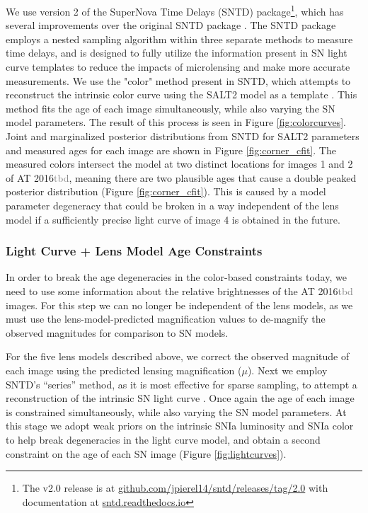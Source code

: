 \documentclass[12pt,dvipsnames]{article}
\def\SNABC{AT 2016{\textcolor{Gray}{tbd}}\xspace}
\begin{document}
We use version 2 of the SuperNova Time Delays (SNTD) package\footnote{The v2.0 release is at \href{https://github.com/jpierel14/sntd/releases/tag/2.0}{github.com/jpierel14/sntd/releases/tag/2.0} with documentation at 
\href{https://sntd.readthedocs.io/en/latest/}{sntd.readthedocs.io}}, which has several improvements over the original SNTD package \cite{pierel_turning_2019}. The SNTD package employs a nested sampling algorithm within three separate methods to measure time delays, and is designed to fully utilize the information present in SN light curve templates \cite{hsiao_k_2007,guy_salt2:_2007,kessler_results_2010,pierel_extending_2018} to reduce the impacts of microlensing and make more accurate measurements. We use the "color" method present in SNTD, which attempts to reconstruct the intrinsic color curve using the SALT2 model as a template \cite{guy_salt2:_2007}. This method fits the age of each image simultaneously, while also varying the SN model parameters. The result of this process is seen in Figure \ref{fig:colorcurves}. Joint and marginalized posterior distributions
from SNTD for SALT2 parameters and measured ages for each image are shown in Figure \ref{fig:corner_cfit}.  The measured colors intersect the model at two distinct locations for images 1 and 2 of \SNABC, meaning there are two plausible ages that cause a double peaked posterior distribution (Figure \ref{fig:corner_cfit}). This is caused by a model parameter degeneracy that could be broken in a way independent of the lens model if a sufficiently precise light curve of image 4 is obtained in the future.


\subsubsection*{Light Curve + Lens Model Age Constraints}

In order to break the age degeneracies in the color-based constraints today, we need to use some information about the relative brightnesses of the \SNABC images.  For this step we can no longer be independent of the lens models, as we must use the lens-model-predicted magnification values to de-magnify the observed magnitudes for comparison to SN models. 

For the five lens models described above, we correct the observed magnitude of each image using the predicted lensing magnification ($\mu$). Next we employ SNTD's ``series'' method, as it is most effective for sparse sampling, to attempt a reconstruction of the intrinsic SN light curve \cite{pierel_turning_2019}. Once again the age of each image is constrained simultaneously, while also varying the SN model parameters. At this stage we adopt weak priors on the intrinsic SNIa luminosity \cite{wang_determination_2006} and SNIa color \cite{mosher_cosmological_2014} to help break degeneracies in the light curve model, and obtain a second constraint on the age of each SN image (Figure \ref{fig:lightcurves}). 
\end{document}
